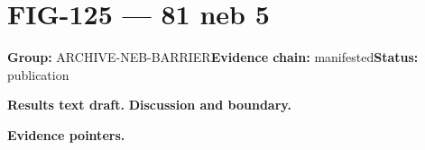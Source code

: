 \clearpage
\section{FIG-125 --- 81 neb 5}
\label{figpage:fig-125}
\textbf{Group:} ARCHIVE-NEB-BARRIER\quad \textbf{Evidence chain:} manifested\quad \textbf{Status:} publication

\textbf{Results text draft.} 
\textbf{Discussion and boundary.} 


\textbf{Evidence pointers.}



\vfill
